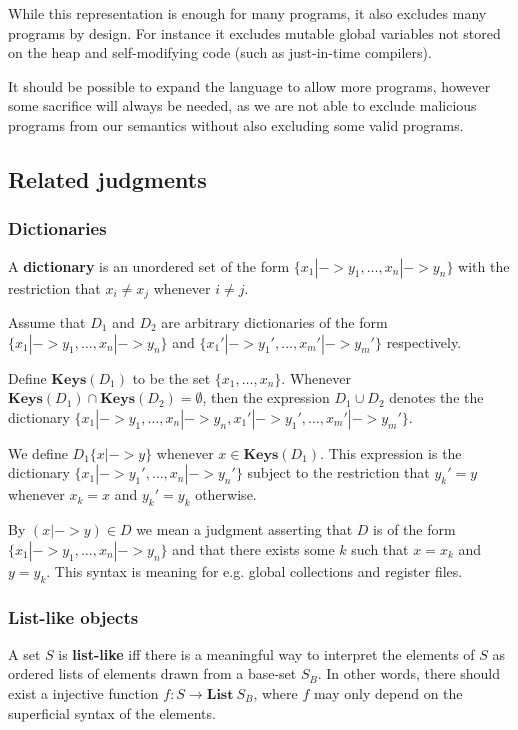 While this representation is enough for many programs, it also excludes many
programs by design. For instance it excludes mutable global variables not stored
on the heap and self-modifying code (such as just-in-time compilers).

It should be possible to expand the language to allow more programs, however
some sacrifice will always be needed, as we are not able to exclude malicious
programs from our semantics without also excluding some valid programs.

\subsection{Related judgments}


\subsubsection{Dictionaries}
A \textbf{dictionary} is an unordered set of the form
$\{x_1 |-> y_1, \dots, x_n |-> y_n\}$ with the restriction that $x_i \neq x_j$
whenever $i \neq j$.

Assume that $D_1$ and $D_2$ are arbitrary dictionaries of the form
$\{x_1 |-> y_1, \dots, x_n |-> y_n\}$ and
$\{x_1' |-> y_1', \dots, x_m' |-> y_m'\}$ respectively.

Define $\mathbf{Keys}(D_1)$ to be the set $\{x_1, \dots, x_n\}$. Whenever
$\mathbf{Keys}(D_1) \cap \mathbf{Keys}(D_2) = \emptyset$, then the expression
$D_1 \cup D_2$ denotes the the dictionary
$\{x_1 |-> y_1, \dots, x_n |-> y_n, x_1' |-> y_1', \dots, x_m' |-> y_m'\}$.

We define $D_1\{x |-> y\}$ whenever $x \in \mathbf{Keys}(D_1)$. This expression
is the dictionary $\{x_1 |-> y_1', \dots, x_n |-> y_n'\}$ subject to the
restriction that $y_k' = y$ whenever $x_k = x$ and $y_k' = y_k$ otherwise.

By $(x |-> y) \in D$ we mean a judgment asserting that $D$ is of the form
$\{x_1 |-> y_1, \dots, x_n |-> y_n\}$ and that there exists some $k$ such that
$x = x_k$ and $y = y_k$. This syntax is meaning for e.g. global collections and
register files.

\subsubsection{List-like objects}
A set $S$ is \textbf{list-like} iff there is a meaningful way to interpret the
elements of $S$ as ordered lists of elements drawn from a base-set $S_B$. In
other words, there should exist a injective function
$f : S \to \mathbf{List}\ S_B$, where $f$ may only depend on the superficial
syntax of the elements.

